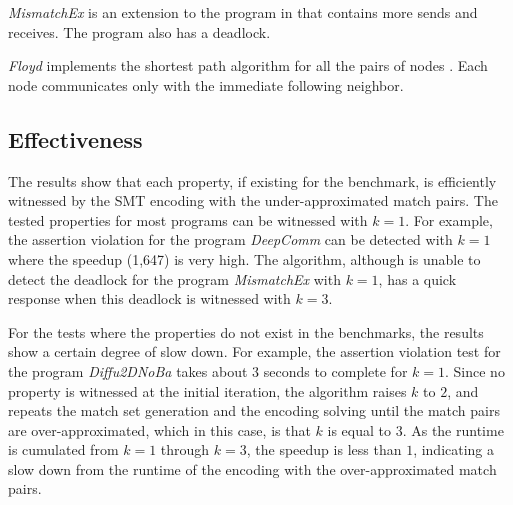 \textit{MismatchEx} is an extension to the program in  that contains more sends and receives. The program also has a deadlock. 

\textit{Floyd} implements the shortest path algorithm for all the pairs of nodes \cite{DBLP:conf/ppopp/XueLWGCZZV09}. Each node communicates only with the immediate following neighbor. 

\subsection{Effectiveness}

The results show that each property, if existing for the benchmark, is efficiently witnessed by the SMT encoding with the under-approximated match pairs.  The tested properties for most programs can be witnessed with $k=1$. For example, the assertion violation for the program \textit{DeepComm} can be detected with $k=1$ where the speedup (1,647) is very high. 
The algorithm, although is unable to detect the deadlock for the program \textit{MismatchEx} with $k=1$, has a quick response when this deadlock is witnessed with $k=3$.


For the tests where the properties do not exist in the benchmarks, the results show a certain degree of slow down. For example, the assertion violation test for the program \textit{Diffu2DNoBa} takes about 3 seconds to complete for $k=1$. Since no property is witnessed at the initial iteration, the algorithm raises $k$ to $2$, and repeats the match set generation and the encoding solving until the match pairs are over-approximated, which in this case, is that $k$ is equal to $3$. As the runtime is cumulated from $k=1$ through $k=3$, the speedup is less than $1$, indicating a slow down from the runtime of the encoding with the over-approximated match pairs.
 


